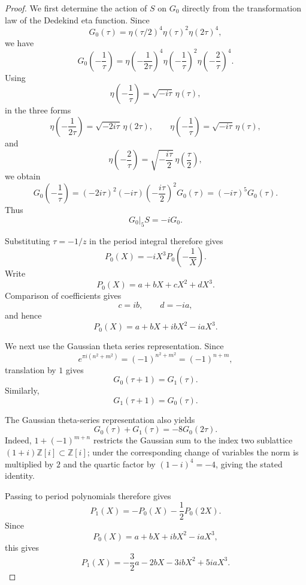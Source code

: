 \documentclass[preprint,12pt]{elsarticle}
\theoremstyle{definition}
\theoremstyle{remark}
\begin{document}
\begin{proof}
	We first determine the action of $S$ on $G_0$ directly from the transformation law of the Dedekind eta function.  Since
	\[
	G_0(\tau)=\eta(\tau/2)^4\eta(\tau)^2\eta(2\tau)^4,
	\]
	we have
	\[
	G_0\left(-\frac{1}{\tau}\right)
	=
	\eta\left(-\frac{1}{2\tau}\right)^4
	\eta\left(-\frac{1}{\tau}\right)^2
	\eta\left(-\frac{2}{\tau}\right)^4.
	\]
	Using
	\[
	\eta\left(-\frac{1}{\tau}\right)=\sqrt{-i\tau}\,\eta(\tau),
	\]
	in the three forms
	\[
	\eta\left(-\frac{1}{2\tau}\right)=\sqrt{-2i\tau}\,\eta(2\tau),
	\qquad
	\eta\left(-\frac{1}{\tau}\right)=\sqrt{-i\tau}\,\eta(\tau),
	\]
	and
	\[
	\eta\left(-\frac{2}{\tau}\right)
	=
	\sqrt{-\frac{i\tau}{2}}\,\eta\left(\frac{\tau}{2}\right),
	\]
	we obtain
	\[
	G_0\left(-\frac{1}{\tau}\right)
	=
	(-2i\tau)^2(-i\tau)\left(-\frac{i\tau}{2}\right)^2
	G_0(\tau)
	=
	(-i\tau)^5G_0(\tau).
	\]
	Thus
	\[
	G_0|_5S=-iG_0.
	\]
	
	Substituting $\tau=-1/z$ in the period integral therefore gives
	\[
	P_0(X)=-iX^3P_0\left(-\frac{1}{X}\right).
	\]
	Write
	\[
	P_0(X)=a+bX+cX^2+dX^3.
	\]
	Comparison of coefficients gives
	\[
	c=ib,\qquad d=-ia,
	\]
	and hence
	\[
	P_0(X)=a+bX+ibX^2-iaX^3.
	\]
	
	We next use the Gaussian theta series representation.  Since
	\[
	e^{\pi i(n^2+m^2)}=(-1)^{n^2+m^2}=(-1)^{n+m},
	\]
	translation by $1$ gives
	\[
	G_0(\tau+1)=G_1(\tau).
	\]
	Similarly,
	\[
	G_1(\tau+1)=G_0(\tau).
	\]
	
The Gaussian theta-series representation also yields
\[
G_0(\tau)+G_1(\tau)=-8G_0(2\tau).
\]
Indeed, $1+(-1)^{m+n}$ restricts the Gaussian sum to the index two
sublattice $(1+i)\mathbb Z[i]\subset\mathbb Z[i]$; under the corresponding
change of variables the norm is multiplied by $2$ and the quartic factor by
$(1-i)^4=-4$, giving the stated identity.	
	
	
	
	
%	
Passing to period polynomials therefore gives
\[
P_1(X)=-P_0(X)-\frac12P_0(2X).
\]
	Since
	\[
	P_0(X)=a+bX+ibX^2-iaX^3,
	\]
	this gives
	\[
	P_1(X)
	=
	-\frac{3}{2}a-2bX-3ibX^2+5iaX^3.
	\]
	

\end{proof}
\end{document}
